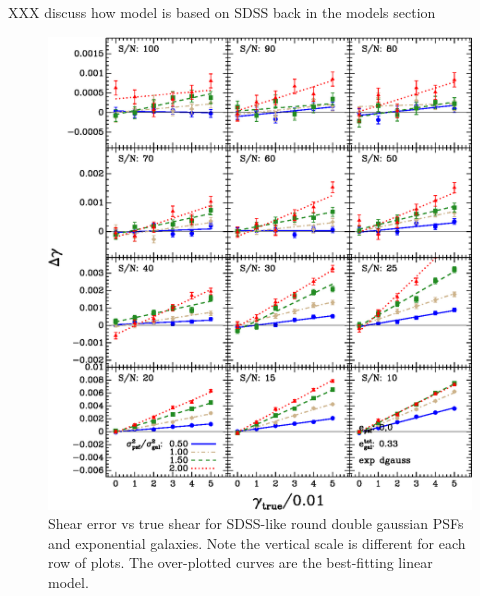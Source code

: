 \documentclass[10pt,preprint]{aastex}
\newcommand{\psf}{PSF}
\begin{document}
XXX discuss how model is based on SDSS back in the models section


\begin{figure}[p] \centering
 \centering 
 \includegraphics[scale=1.1]{figures/set-s2n-edg04-vs-shear.eps}

 \caption{Shear error vs true shear for SDSS-like round double gaussian \psf s
 and exponential galaxies.  Note the vertical scale is different for each row
 of plots.  The over-plotted curves are the best-fitting linear model.}
 \label{fig:edgdiffvsshroundpsf}

\end{figure}
\end{document}
